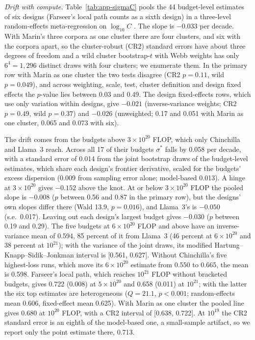 \textit{Drift with compute.} Table~\ref{tab:app-sigmaC} pools the 44 budget-level estimates of six designs (Farseer's local
path counts as a sixth design) in a three-level random-effects meta-regression on $\log_{10}C$
\citep{konstantopoulos2011fixed}. The slope is $-0.033$ per decade. With Marin's three corpora as one cluster there are
four clusters, and six with the corpora apart, so the cluster-robust (CR2) standard errors
\citep{bell2002bias,pustejovsky2018small} have about three degrees of freedom and a wild cluster bootstrap-$t$ with
Webb weights has only $6^4=1{,}296$ distinct draws with four clusters; we enumerate them. In the primary row with Marin
as one cluster the two tests disagree (CR2 $p=0.11$, wild $p=0.049$), and across weighting, scale, test, cluster
definition and design fixed effects the $p$-value lies between 0.03 and 0.49. The design fixed-effects rows, which use
only variation within designs, give $-0.021$ (inverse-variance weights; CR2 $p=0.49$, wild $p=0.37$) and $-0.026$
(unweighted; 0.17 and 0.051 with Marin as one cluster, 0.065 and 0.073 with six).

The drift comes from the budgets above $3\times10^{20}$ FLOP, which only Chinchilla and Llama~3 reach. Across all 17 of
their budgets $\sigma^*$ falls by 0.058 per decade, with a standard error of 0.014 from the joint bootstrap draws of the
budget-level estimates, which share each design's frontier derivative, scaled for the budgets' excess dispersion (0.009
from sampling error alone; model-based 0.013). A hinge at $3\times10^{20}$ gives $-0.152$ above the knot. At or below
$3\times10^{20}$ FLOP the pooled slope is $-0.008$ ($p$ between 0.56 and 0.87 in the primary row), but the designs' own
slopes differ there (Wald 13.9, $p=0.016$), and Llama~3's is $-0.050$ (s.e.\ 0.017). Leaving out each design's largest
budget gives $-0.030$ ($p$ between 0.19 and 0.29). The five budgets at $6\times10^{20}$ FLOP and above have an
inverse-variance mean of 0.594, 85 percent of it from Llama~3 (46 percent at $6\times10^{20}$ and 38 percent at
$10^{21}$); with the variance of the joint draws, its modified Hartung--Knapp--Sidik--Jonkman interval is [0.561, 0.627].
Without Chinchilla's five highest-loss runs, which move its $6\times10^{20}$ estimate from 0.550 to 0.665, the mean is
0.598. Farseer's local path, which reaches $10^{21}$ FLOP without bracketed budgets, gives 0.722 (0.008) at
$5\times10^{20}$ and 0.658 (0.011) at $10^{21}$; with the latter the six top estimates are heterogeneous ($Q=21.1$,
$p<0.001$; random-effects mean 0.606, fixed-effect mean 0.625). With Marin as one cluster the pooled line gives 0.680 at
$10^{20}$ FLOP, with a CR2 interval of [0.638, 0.722]. At $10^{19}$ the CR2 standard error is an eighth of the
model-based one, a small-sample artifact, so we report only the point estimate there, 0.713.

